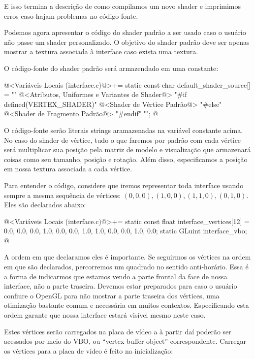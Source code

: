 E isso termina a descrição de como compilamos um novo shader e
imprimimos erros caso hajam problemas no código-fonte.

Podemos agora apresentar o código do shader padrão a ser usado caso o
usuário não passe um shader personalizado. O objetivo do shader padrão
deve ser apenas mostrar a textura associada à interface caso exista
uma textura.

O código-fonte do shader padrão será armazendado em uma constante:

\iniciocodigo
@<Variáveis Locais (interface.c)@>+=
static const char default_shader_source[] = ""
@<Atributos, Uniformes e Variantes de Shader@>
"#if defined(VERTEX_SHADER)\n"
@<Shader de Vértice Padrão@>
"#else\n"
@<Shader de Fragmento Padrão@>
"#endif\n"
                                           "";
@
\fimcodigo

O código-fonte serão literais strings aramazenadas na variável
constante acima. No caso do shader de vértice, tudo o que faremos por
padrão com cada vértice será multiplicar sua posição pela matriz de
modelo e visualização que armazenará coisas como seu tamanho, posição
e rotação. Além disso, especificamos a posição em nossa textura
associada a cada vértice.

Para entender o código, considere que iremos representar toda
interface usando sempre a mesma sequência de vértices: $(0, 0, 0), (1,
0, 0), (1, 1, 0), (0, 1, 0)$. Eles são declarados abaixo:

\iniciocodigo
@<Variáveis Locais (interface.c)@>+=
static const float interface_vertices[12] = {0.0, 0.0, 0.0,
                                             1.0, 0.0, 0.0,
                                             1.0, 1.0, 0.0,
                                             0.0, 1.0, 0.0};
static GLuint interface_vbo;
@
\fimcodigo

A ordem em que declaramos eles é importante. Se seguirmos os vértices
na ordem em que são declarados, percorremos um quadrado no sentido
anti-horário. Essa é a forma de indicarmos que estamos vendo a parte
frontal da face de nossa interface, não a parte traseira. Devemos
estar preparados para caso o usuário confiure o OpenGL para não
mostrar a parte traseira dos vértices, uma otimização bastante comum e
necessária em muitos contextos. Especificando esta ordem garante que
nossa interface estará visível mesmo neste caso.

Estes vértices serão carregados na placa de vídeo a à partir daí
poderão ser acessados por meio do VBO, ou ``vertex buffer object''
correspondente. Carregar os vértices para a placa de vídeo é feito na
inicialização:

